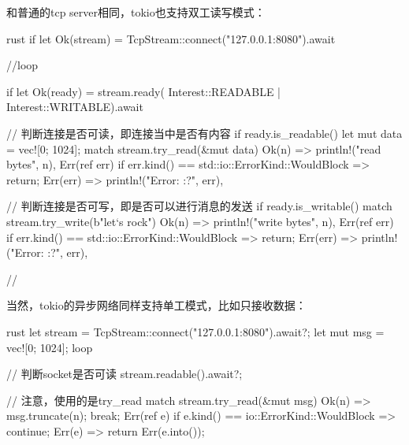 和普通的tcp server相同，tokio也支持双工读写模式：
\begin{code-block}{rust}
if let Ok(stream) = TcpStream::connect("127.0.0.1:8080").await {
    //loop {
    if let Ok(ready) = stream.ready(
        Interest::READABLE | Interest::WRITABLE).await {
        // 判断连接是否可读，即连接当中是否有内容
        if ready.is_readable() {
            let mut data = vec![0; 1024];
            match stream.try_read(&mut data) {
                Ok(n) => println!("read {} bytes", n),
                Err(ref err) if err.kind() == std::io::ErrorKind::WouldBlock => {
                    return;
                }
                Err(err) => println!("Error: {:?}", err),
            }
        }

        // 判断连接是否可写，即是否可以进行消息的发送
        if ready.is_writable() {
            match stream.try_write(b"let`s rock") {
                Ok(n) => println!("write {} bytes", n),
                Err(ref err) if err.kind() == std::io::ErrorKind::WouldBlock => {
                    return;
                }
                Err(err) => println!("Error: {:?}", err),
            }
        }
    }
    //}
}
\end{code-block}
当然，tokio的异步网络同样支持单工模式，比如只接收数据：
\begin{code-block}{rust}
let stream = TcpStream::connect("127.0.0.1:8080").await?;
let mut msg = vec![0; 1024];
loop {
    // 判断socket是否可读
    stream.readable().await?;

    // 注意，使用的是try_read
    match stream.try_read(&mut msg) {
        Ok(n) => {
            msg.truncate(n);
            break;
        }
        Err(ref e) if e.kind() == io::ErrorKind::WouldBlock => {
            continue;
        }
        Err(e) => {
            return Err(e.into());
        }
    }
}
\end{code-block}

